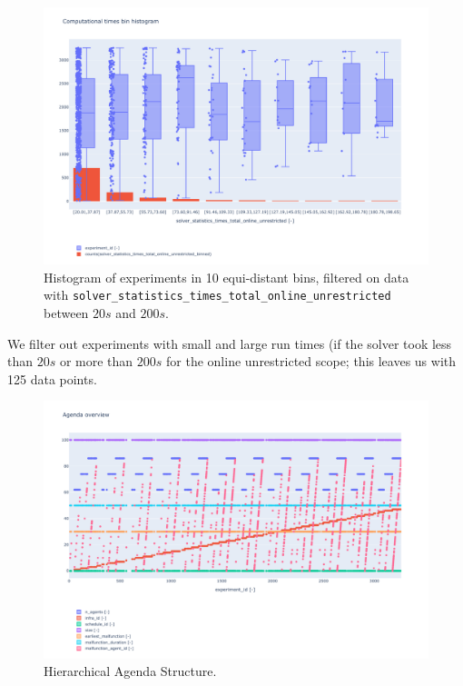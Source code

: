 \documentclass{article}
\begin{document}
\begin{figure}[hbtp]
    \includegraphics[width=\textwidth]{Figures/04_computational_results/times_total_histogram.pdf}
	\caption{Histogram of experiments in 10 equi-distant bins, filtered on data with \texttt{solver\_statistics\_times\_total\_online\_unrestricted} between $20s$ and $200s$.}
	\label{fig:agenda_histogram}
\end{figure}




We filter out experiments with small and large run times (if the solver took less than $20s$ or more than $200s$ for the online unrestricted scope; this leaves us with 125 data points.

\begin{figure}[hbtp]
    \includegraphics[width=\textwidth]{Figures/04_computational_results/agenda.pdf}
	\caption{Hierarchical Agenda Structure.}
	\label{fig:agenda}
\end{figure}
\end{document}
